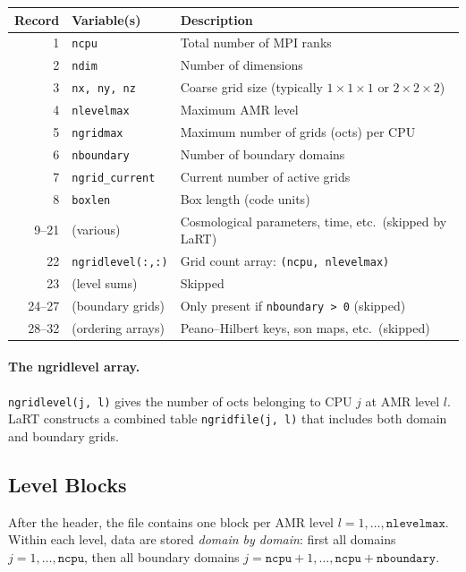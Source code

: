 \documentclass[english,a4paper]{my_memo}
\begin{document}
\begin{center}
\begin{tabular}{rll}
\toprule
Record & Variable(s) & Description \\
\midrule
1  & \texttt{ncpu}          & Total number of MPI ranks \\
2  & \texttt{ndim}          & Number of dimensions \\
3  & \texttt{nx, ny, nz}    & Coarse grid size (typically $1\times1\times1$ or $2\times2\times2$) \\
4  & \texttt{nlevelmax}     & Maximum AMR level \\
5  & \texttt{ngridmax}      & Maximum number of grids (octs) per CPU \\
6  & \texttt{nboundary}     & Number of boundary domains \\
7  & \texttt{ngrid\_current}& Current number of active grids \\
8  & \texttt{boxlen}        & Box length (code units) \\
9--21 & (various)           & Cosmological parameters, time, etc.\ (skipped by LaRT)\\
22 & \texttt{ngridlevel(:,:)} & Grid count array: \texttt{(ncpu, nlevelmax)} \\
23 & (level sums)           & Skipped \\
24--27 & (boundary grids)   & Only present if \texttt{nboundary > 0} (skipped) \\
28--32 & (ordering arrays)  & Peano--Hilbert keys, son maps, etc.\ (skipped) \\
\bottomrule
\end{tabular}
\end{center}

\paragraph{The ngridlevel array.}
\texttt{ngridlevel(j, l)} gives the number of octs belonging to CPU $j$
at AMR level $l$.  LaRT constructs a combined table
\texttt{ngridfile(j, l)} that includes both domain and boundary grids.

\subsection{Level Blocks}

After the header, the file contains one block per AMR level
$l = 1, \ldots, \texttt{nlevelmax}$.  Within each level, data are stored
\emph{domain by domain}: first all domains $j = 1, \ldots, \texttt{ncpu}$,
then all boundary domains $j = \texttt{ncpu}+1, \ldots,
\texttt{ncpu}+\texttt{nboundary}$.
\end{document}
